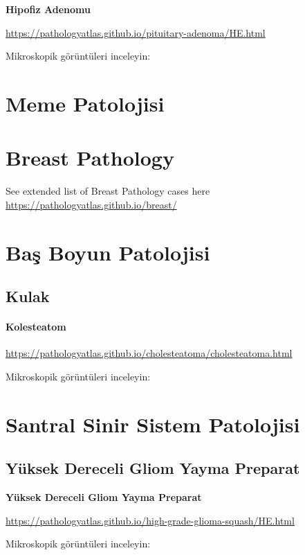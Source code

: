 \documentclass[
  letterpaper,
  DIV=11,
  numbers=noendperiod]{scrreprt}
\begin{document}
\textbf{Hipofiz Adenomu}

\url{https://pathologyatlas.github.io/pituitary-adenoma/HE.html}

Mikroskopik görüntüleri inceleyin:

\part{Meme Patolojisi}

\part{Breast Pathology}

See extended list of Breast Pathology cases here
\url{https://pathologyatlas.github.io/breast/}

\part{Baş Boyun Patolojisi}

\hypertarget{kulak}{%
\chapter{Kulak}\label{kulak}}

\hypertarget{kolesteatom}{%
\subsection{Kolesteatom}\label{kolesteatom}}

\url{https://pathologyatlas.github.io/cholesteatoma/cholesteatoma.html}

Mikroskopik görüntüleri inceleyin:

\part{Santral Sinir Sistem Patolojisi}

\hypertarget{yuxfcksek-dereceli-gliom-yayma-preparat}{%
\chapter{Yüksek Dereceli Gliom Yayma
Preparat}\label{yuxfcksek-dereceli-gliom-yayma-preparat}}

\textbf{Yüksek Dereceli Gliom Yayma Preparat}

\url{https://pathologyatlas.github.io/high-grade-glioma-squash/HE.html}

Mikroskopik görüntüleri inceleyin:
\end{document}

